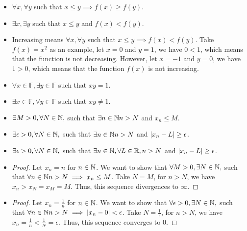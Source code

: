 \documentclass[8pt,twocolumn]{article}
\begin{document}
\begin{Answer}[number=2.3.14]
  \begin{itemize}
    \item $\forall x, \forall y$ such that $x\le y\implies f(x)\ge f(y)$.
    \item $\exists x, \exists y$ such that $x\le y$ and $f(x) < f(y)$.
    \item Increasing means $\forall x, \forall y$ such that $x\le y\implies
      f(x)< f(y)$. Take $f(x) = x^2$ as an example, let $x=0$ and $y=1$, we
      have $0<1$, which means that the function is not decreasing. However, let
      $x = -1$ and $y=0$, we have $1>0$, which means that the function $f(x)$
      is not increasing.
  \end{itemize}
\end{Answer}

\begin{Answer}[number=2.3.16]
  \begin{itemize}
    \item $\forall x \in \mathbb{F}, \exists y \in \mathbb{F}$ such that
      $xy=1$.
    \item $\exists x \in \mathbb{F}, \forall y \in \mathbb{F}$ such that
      $xy\ne1$.
  \end{itemize}
\end{Answer}

\begin{Answer}[number=2.3.17]
  \begin{itemize}
    \item $\exists M > 0, \forall N \in \mathbb{N},$ such that $\exists n\in \mathbb{N} n>N$
      and $x_n \le M$.
    \item $\exists \epsilon > 0, \forall N \in \mathbb{N},$ such that $\exists n\in \mathbb{N} n>N$
      and $\abs{x_n - L}\ge \epsilon$.
    \item $\exists \epsilon > 0, \forall N \in \mathbb{N},$ such that $\exists n\in \mathbb{N},
      \forall L \in \mathbb{R}, n>N$ and $\abs{x_n - L}\ge \epsilon$.
    \item \begin{proof}
      Let $x_n=n$ for $n\in \mathbb{N}$. We want to show that $\forall M > 0, \exists N
      \in \mathbb{N},$ such that $\forall n\in \mathbb{N} n>N \implies x_n \le M$. Take $N=M$,
      for $n>N$, we have $x_n > x_{N} = x_{M} = M$. Thus, this sequence
      divergences to $\infty$.
    \end{proof}
    \item \begin{proof}
      Let $x_n=\frac{1}{n}$ for $n\in \mathbb{N}$. We want to show that $\forall
      \epsilon > 0, \exists N \in \mathbb{N},$ such that $\forall n\in \mathbb{N} n>N \implies
      \abs{x_n-0} < \epsilon$. Take $N=\frac{1}{\epsilon}$, for $n>N$, we have
      $x_n = \frac{1}{n} < \frac{1}{N} = \epsilon$. Thus, this sequence
      converges to $0$.
    \end{proof}
  \end{itemize}
\end{Answer}
\end{document}
